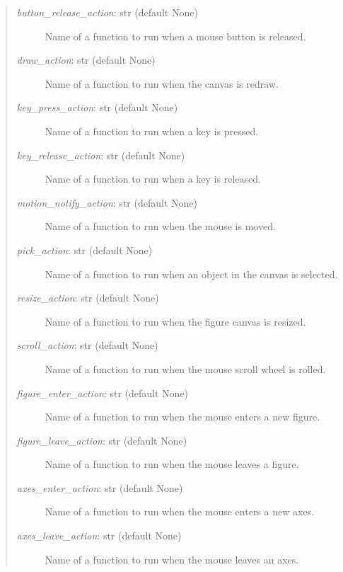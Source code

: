 \documentclass[letterpaper,10pt,english]{sphinxmanual}
\begin{document}
\begin{fulllineitems}
\begin{quote}
\begin{description}
\item[{\emph{button\_release\_action}: str (default None)}] \leavevmode
Name of a function to run when a mouse button is released.

\item[{\emph{draw\_action}: str (default None)}] \leavevmode
Name of a function to run when the canvas is redraw.

\item[{\emph{key\_press\_action}: str (default None)}] \leavevmode
Name of a function to run when a key is pressed.

\item[{\emph{key\_release\_action}: str (default None)}] \leavevmode
Name of a function to run when a key is released.

\item[{\emph{motion\_notify\_action}: str (default None)}] \leavevmode
Name of a function to run when the mouse is moved.

\item[{\emph{pick\_action}: str (default None)}] \leavevmode
Name of a function to run when an object in the canvas is selected.

\item[{\emph{resize\_action}: str (default None)}] \leavevmode
Name of a function to run when the figure canvas is resized.

\item[{\emph{scroll\_action}: str (default None)}] \leavevmode
Name of a function to run when the mouse scroll wheel is rolled.

\item[{\emph{figure\_enter\_action}: str (default None)}] \leavevmode
Name of a function to run when the mouse enters a new figure.

\item[{\emph{figure\_leave\_action}: str (default None)}] \leavevmode
Name of a function to run when the mouse leaves a figure.

\item[{\emph{axes\_enter\_action}: str (default None)}] \leavevmode
Name of a function to run when the mouse enters a new axes.

\item[{\emph{axes\_leave\_action}: str (default None)}] \leavevmode
Name of a function to run when the mouse leaves an axes.

\end{description}
\end{quote}


\end{fulllineitems}
\end{document}
